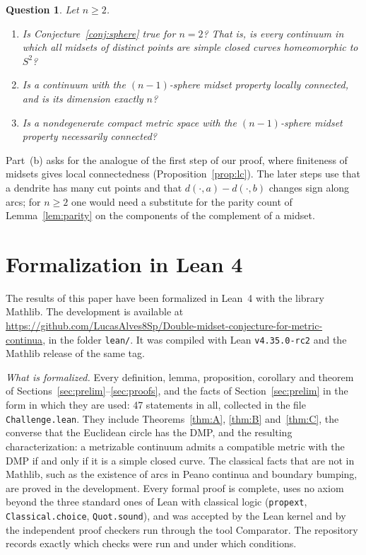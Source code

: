 \documentclass[11pt]{amsart}
\newtheorem{question}[theorem]{Question}
\theoremstyle{definition}
\theoremstyle{remark}
\begin{document}
\begin{question}\label{q:sphere}
Let $n\ge2$.
\begin{enumerate}[label=(\alph*),leftmargin=*]
\item Is Conjecture~\ref{conj:sphere} true for $n=2$? That is, is every continuum in which all midsets of distinct points are simple closed curves homeomorphic to $S^2$?
\item Is a continuum with the $(n-1)$-sphere midset property locally connected, and is its dimension exactly $n$?
\item Is a nondegenerate compact metric space with the $(n-1)$-sphere midset property necessarily connected?
\end{enumerate}
\end{question}

\noindent
Part~(b) asks for the analogue of the first step of our proof, where finiteness of midsets gives local connectedness (Proposition~\ref{prop:lc}). The later steps use that a dendrite has many cut points and that $d(\cdot,a)-d(\cdot,b)$ changes sign along arcs; for $n\ge2$ one would need a substitute for the parity count of Lemma~\ref{lem:parity} on the components of the complement of a midset.

\section*{Formalization in Lean 4}

The results of this paper have been formalized in Lean~4 with the library Mathlib. The development is available at \url{https://github.com/LucasAlves8Sp/Double-midset-conjecture-for-metric-continua}, in the folder \texttt{lean/}. It was compiled with Lean \texttt{v4.35.0-rc2} and the Mathlib release of the same tag.

\emph{What is formalized.} Every definition, lemma, proposition, corollary and theorem of Sections~\ref{sec:prelim}--\ref{sec:proofs}, and the facts of Section~\ref{sec:prelim} in the form in which they are used: 47 statements in all, collected in the file \texttt{Challenge.lean}. They include Theorems~\ref{thm:A}, \ref{thm:B} and~\ref{thm:C}, the converse that the Euclidean circle has the DMP, and the resulting characterization: a metrizable continuum admits a compatible metric with the DMP if and only if it is a simple closed curve. The classical facts that are not in Mathlib, such as the existence of arcs in Peano continua and boundary bumping, are proved in the development. Every formal proof is complete, uses no axiom beyond the three standard ones of Lean with classical logic (\texttt{propext}, \texttt{Classical.choice}, \texttt{Quot.sound}), and was accepted by the Lean kernel and by the independent proof checkers run through the tool Comparator. The repository records exactly which checks were run and under which conditions.
\end{document}
